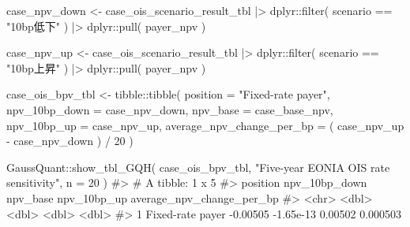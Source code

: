 \documentclass[
  letterpaper,
  DIV=11,
  numbers=noendperiod]{scrreprt}
\newenvironment{Shaded}{\begin{snugshade}}{\end{snugshade}}
\newcommand{\AttributeTok}[1]{\textcolor[rgb]{0.40,0.45,0.13}{#1}}
\newcommand{\CommentTok}[1]{\textcolor[rgb]{0.37,0.37,0.37}{#1}}
\newcommand{\DecValTok}[1]{\textcolor[rgb]{0.68,0.00,0.00}{#1}}
\newcommand{\FunctionTok}[1]{\textcolor[rgb]{0.28,0.35,0.67}{#1}}
\newcommand{\NormalTok}[1]{\textcolor[rgb]{0.00,0.23,0.31}{#1}}
\newcommand{\OtherTok}[1]{\textcolor[rgb]{0.00,0.23,0.31}{#1}}
\newcommand{\SpecialCharTok}[1]{\textcolor[rgb]{0.37,0.37,0.37}{#1}}
\newcommand{\StringTok}[1]{\textcolor[rgb]{0.13,0.47,0.30}{#1}}
\begin{document}
\begin{Shaded}
\begin{Highlighting}[]
\NormalTok{case\_npv\_down }\OtherTok{\textless{}{-}}\NormalTok{ case\_ois\_scenario\_result\_tbl }\SpecialCharTok{|\textgreater{}}
\NormalTok{  dplyr}\SpecialCharTok{::}\FunctionTok{filter}\NormalTok{(}
\NormalTok{    scenario }\SpecialCharTok{==} \StringTok{"10bp低下"}
\NormalTok{  ) }\SpecialCharTok{|\textgreater{}}
\NormalTok{  dplyr}\SpecialCharTok{::}\FunctionTok{pull}\NormalTok{(}
\NormalTok{    payer\_npv}
\NormalTok{  )}

\NormalTok{case\_npv\_up }\OtherTok{\textless{}{-}}\NormalTok{ case\_ois\_scenario\_result\_tbl }\SpecialCharTok{|\textgreater{}}
\NormalTok{  dplyr}\SpecialCharTok{::}\FunctionTok{filter}\NormalTok{(}
\NormalTok{    scenario }\SpecialCharTok{==} \StringTok{"10bp上昇"}
\NormalTok{  ) }\SpecialCharTok{|\textgreater{}}
\NormalTok{  dplyr}\SpecialCharTok{::}\FunctionTok{pull}\NormalTok{(}
\NormalTok{    payer\_npv}
\NormalTok{  )}

\NormalTok{case\_ois\_bpv\_tbl }\OtherTok{\textless{}{-}}\NormalTok{ tibble}\SpecialCharTok{::}\FunctionTok{tibble}\NormalTok{(}
  \AttributeTok{position =} \StringTok{"Fixed{-}rate payer"}\NormalTok{,}
  \AttributeTok{npv\_10bp\_down =}\NormalTok{ case\_npv\_down,}
  \AttributeTok{npv\_base =}\NormalTok{ case\_base\_npv,}
  \AttributeTok{npv\_10bp\_up =}\NormalTok{ case\_npv\_up,}
  \AttributeTok{average\_npv\_change\_per\_bp =}
\NormalTok{    (}
\NormalTok{      case\_npv\_up }\SpecialCharTok{{-}}
\NormalTok{        case\_npv\_down}
\NormalTok{    ) }\SpecialCharTok{/} \DecValTok{20}
\NormalTok{)}

\NormalTok{GaussQuant}\SpecialCharTok{::}\FunctionTok{show\_tbl\_GQH}\NormalTok{(}
\NormalTok{  case\_ois\_bpv\_tbl,}
  \StringTok{"Five{-}year EONIA OIS rate sensitivity"}\NormalTok{,}
  \AttributeTok{n =} \DecValTok{20}
\NormalTok{)}
\CommentTok{\#\textgreater{} \# A tibble: 1 x 5}
\CommentTok{\#\textgreater{}   position         npv\_10bp\_down  npv\_base npv\_10bp\_up average\_npv\_change\_per\_bp}
\CommentTok{\#\textgreater{}   \textless{}chr\textgreater{}                    \textless{}dbl\textgreater{}     \textless{}dbl\textgreater{}       \textless{}dbl\textgreater{}                     \textless{}dbl\textgreater{}}
\CommentTok{\#\textgreater{} 1 Fixed{-}rate payer      {-}0.00505 {-}1.65e{-}13     0.00502                  0.000503}
\end{Highlighting}
\end{Shaded}
\end{document}
